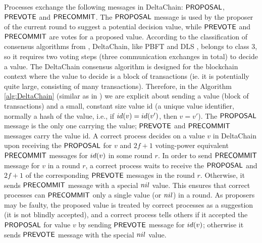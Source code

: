 Processes exchange the following messages in DeltaChain: $\mathsf{PROPOSAL}$,
$\mathsf{PREVOTE}$ and $\mathsf{PRECOMMIT}$. The $\mathsf{PROPOSAL}$ message is used by the proposer of
the current round to suggest a potential decision value, while $\mathsf{PREVOTE}$ and
$\mathsf{PRECOMMIT}$ are votes for a proposed value. According to the classification of
consensus algorithms from \cite{RMS10:dsn}, DeltaChain, like PBFT
\cite{CL02:tcs} and DLS \cite{DLS88:jacm}, belongs to class 3, so it requires
two voting steps (three communication exchanges in total) to decide a value.
The DeltaChain consensus algorithm is designed for the blockchain context where
the value to decide is a block of transactions (ie. it is potentially quite
large, consisting of many transactions). Therefore, in the Algorithm
\ref{alg:DeltaChain} (similar as in \cite{CL02:tcs}) we are explicit about
sending a value (block of transactions) and a small, constant size value id (a
unique value identifier, normally a hash of the value, i.e., if $id(v) =
id(v')$, then $v=v'$). The $\mathsf{PROPOSAL}$ message is the only one carrying the
value; $\mathsf{PREVOTE}$ and $\mathsf{PRECOMMIT}$ messages carry the value id.  A correct
process decides on a value $v$ in DeltaChain upon receiving the $\mathsf{PROPOSAL}$ for
$v$ and $2f+1$ voting-power equivalent $\mathsf{PRECOMMIT}$ messages for $id(v)$ in
some round $r$. In order to send $\mathsf{PRECOMMIT}$ message for $v$ in a round $r$, a
correct process waits to receive the $\mathsf{PROPOSAL}$ and $2f+1$ of the
corresponding $\mathsf{PREVOTE}$ messages in the round $r$. Otherwise, 
it sends $\mathsf{PRECOMMIT}$ message with a special $nil$ value.  
This ensures that correct processes can $\mathsf{PRECOMMIT}$ only a 
single value (or $nil$) in a round.  As
proposers may be faulty, the proposed value is treated by correct processes as
a suggestion (it is not blindly accepted), and a correct process tells others
if it accepted the $\mathsf{PROPOSAL}$ for value $v$ by sending $\mathsf{PREVOTE}$ message for
$id(v)$; otherwise it sends $\mathsf{PREVOTE}$ message with the special $nil$ value. 

